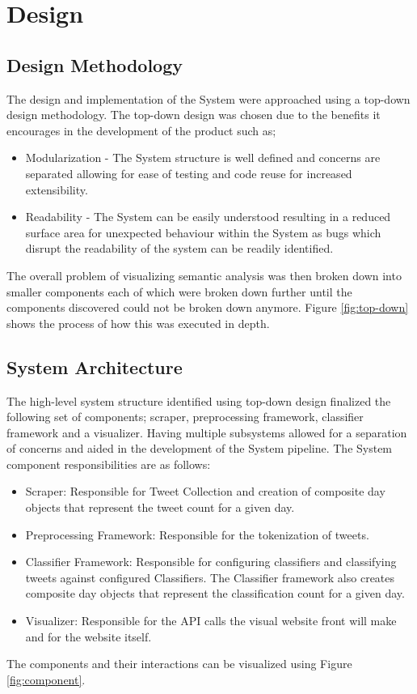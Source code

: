 \documentclass[11pt]{report}
\begin{document}
\chapter{Design}

\section{Design Methodology}

The design and implementation of the System were approached using a top-down design methodology. The top-down design was chosen due to the benefits it encourages in the development of the product such as; 

\begin{itemize}
\item Modularization - The System structure is well defined and concerns are separated allowing for ease of testing and code reuse for increased extensibility.  

\item Readability - The System can be easily understood resulting in a reduced surface area for unexpected behaviour within the System as bugs which disrupt the readability of the system can be readily identified.
\end{itemize}
The overall problem of visualizing semantic analysis was then broken down into smaller components each of which were broken down further until the components discovered could not be broken down anymore. Figure \ref{fig:top-down} shows the process of how this was executed in depth.

\section{System Architecture}
The high-level system structure identified using top-down design finalized the following set of components; scraper, preprocessing framework, classifier framework and a visualizer. Having multiple subsystems allowed for a separation of concerns and aided in the development of the System pipeline.  The System component responsibilities are as follows:

\begin{itemize}
\item Scraper: Responsible for Tweet Collection and creation of composite day objects that represent the tweet count for a given day.
\item Preprocessing Framework: Responsible for the tokenization of tweets.
\item Classifier Framework: Responsible for configuring classifiers and classifying tweets against configured Classifiers. The Classifier framework also creates composite day objects that represent the classification count for a given day.
\item Visualizer: Responsible for the API calls the visual website front will make and for the website itself.
\end{itemize}
The components and their interactions can be visualized using Figure  \ref{fig:component}.
\\
\end{document}
